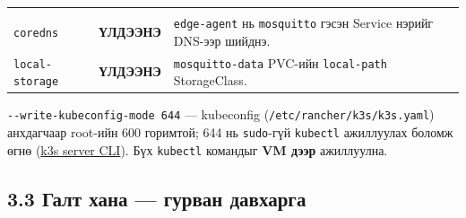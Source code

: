 \begin{longtable}[]{@{}lll@{}}
\begin{minipage}[t]{0.30\columnwidth}
\end{minipage}\tabularnewline
\begin{minipage}[t]{0.30\columnwidth}\raggedright
\texttt{coredns}\strut
\end{minipage} & \begin{minipage}[t]{0.30\columnwidth}\raggedright
\textbf{ҮЛДЭЭНЭ}\strut
\end{minipage} & \begin{minipage}[t]{0.30\columnwidth}\raggedright
\texttt{edge-agent} нь \texttt{mosquitto} гэсэн Service нэрийг DNS-ээр шийднэ.\strut
\end{minipage}\tabularnewline
\begin{minipage}[t]{0.30\columnwidth}\raggedright
\texttt{local-storage}\strut
\end{minipage} & \begin{minipage}[t]{0.30\columnwidth}\raggedright
\textbf{ҮЛДЭЭНЭ}\strut
\end{minipage} & \begin{minipage}[t]{0.30\columnwidth}\raggedright
\texttt{mosquitto-data} PVC-ийн \texttt{local-path} StorageClass.\strut
\end{minipage}\tabularnewline
\bottomrule
\end{longtable}\endgroup

\texttt{-\/\allowbreak{}-write-kubeconfig-mode\ 644} --- kubeconfig (\texttt{/\allowbreak{}etc/\allowbreak{}rancher/\allowbreak{}k3s/\allowbreak{}k3s.\allowbreak{}yaml}) анхдагчаар root-ийн 600 горимтой; 644 нь \texttt{sudo}-гүй \texttt{kubectl} ажиллуулах боломж өгнө (\href{https://docs.k3s.io/cli/server}{k3s server CLI}). Бүх \texttt{kubectl} командыг \textbf{VM дээр} ажиллуулна.

\hypertarget{ux433ux430ux43bux442-ux445ux430ux43dux430-ux433ux443ux440ux432ux430ux43d-ux434ux430ux432ux445ux430ux440ux433ux430}{%
\subsection{3.3 Галт хана --- гурван давхарга}\label{ux433ux430ux43bux442-ux445ux430ux43dux430-ux433ux443ux440ux432ux430ux43d-ux434ux430ux432ux445ux430ux440ux433ux430}}

